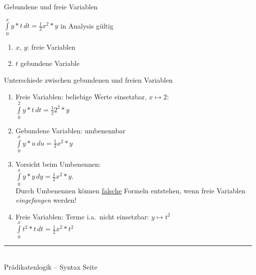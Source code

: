 \documentclass{slides}
\newcommand{\myrule}{\rule{20cm}{1mm}\\ }
\newcounter{mypage}
\begin{document}
\begin{slide}{}
\normalsize
\begin{center}
Gebundene und freie Variablen
\end{center}
\vspace{0.5cm}

\footnotesize
\hspace*{1.3cm} $\int\limits_{0}^{x} y * t\, d t = \frac{1}{2} x^2 * y$ \hspace*{1.3cm} in Analysis g\"{u}ltig
\begin{enumerate}
\item $x$, $y$: freie Variablen
\item $t$ gebundene Variable
\end{enumerate}

Unterschiede zwischen gebundenen und freien Variablen
\begin{enumerate}
\item Freie Variablen: beliebige Werte einsetzbar, $x \mapsto 2$: \\[0.3cm]
\hspace*{1.3cm}  $\int\limits_{0}^{2} y * t\, d t = \frac{1}{2} 2^2 * y$ 
\item Gebundene Variablen: umbenennbar \\[0.1cm]
\hspace*{1.3cm} $\int\limits_{0}^{x} y * u\, d u = \frac{1}{2} x^2 * y$ 
\item Vorsicht beim Umbenennen: \\[0.3cm]
\hspace*{1.3cm}  $\int\limits_{0}^{x} y * y\, d y = \frac{1}{2} x^2 * y$. \\[0.3cm]
      Durch Umbenennen k\"{o}nnen \underline{falsche} Formeln entstehen, wenn freie Variablen
      \emph{eingefangen} werden!  
\item Freie Variablen: Terme i.a.~nicht einsetzbar: $y \mapsto t^2$ \\[0.3cm]
\hspace*{1.3cm} $\int\limits_{0}^{x} t^2 * t\, d t = \frac{1}{2} x^2 * t^2$ \\[0.1cm]
\end{enumerate}


\vspace*{\fill}
\tiny \addtocounter{mypage}{1}
\myrule
Pr\"{a}dikatenlogik -- Syntax  \hspace*{\fill} Seite 
\end{slide}

\end{document}
